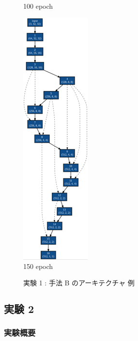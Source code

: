 \begin{figure}[tb]
\begin{minipage}{0.3\hsize}
\begin{center}
    100 epoch
 	\end{center}
 \end{minipage}
 \begin{minipage}{0.3\hsize}
 	\begin{center}
    \includegraphics[clip,scale=0.8]{./fig/04.exp/b150.png}\\
    150 epoch
 	\end{center}
 \end{minipage}
 \caption{実験 1 : 手法 B のアーキテクチャ 例}
 \label{fig:exp1_b}
\end{figure}










\clearpage\newpage
\changeindent{0cm}
\subsection{実験 2}
\label{sec:exp.02}
\changeindent{2cm}



\changeindent{0cm}
\subsubsection{実験概要}
\label{sec:exp.02_01}
\changeindent{2cm}

